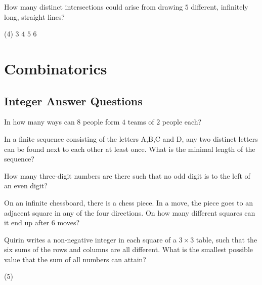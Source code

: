 \documentclass{article}
\begin{document}
\begin{problem}
How many distinct intersections could arise from drawing $5$ different, infinitely long, straight lines?
\begin{tasks2}(4)
\task $3$
\task $4$
\task $5$
\task $6$
\end{tasks2}
\end{problem}

\newpage

\section{Combinatorics}
\subsection{Integer Answer Questions}

\begin{problem}
In how many ways can $8$ people form $4$ teams of $2$ people each?
\end{problem}

\begin{problem}
In a finite sequence consisting of the letters A,B,C and D, any two distinct letters can be found next to each other at least once. What is the minimal length of the sequence?
\end{problem}

\begin{problem}
How many three-digit numbers are there such that no odd digit is to the left of an even digit?
\end{problem}

\begin{problem}
On an infinite chessboard, there is a chess piece. In a move, the piece goes to an adjacent square in any of the four directions. On how many different squares can it end up after $6$ moves?
\end{problem}

\begin{problem}
Quirin writes a non-negative integer in each square of a $3 \times 3$ table, such that the six sums of the rows and columns are all different. What is the smallest possible value that the sum of all numbers can attain?
\end{problem}
\begin{tasks}(5)
\end{tasks}
\end{document}
